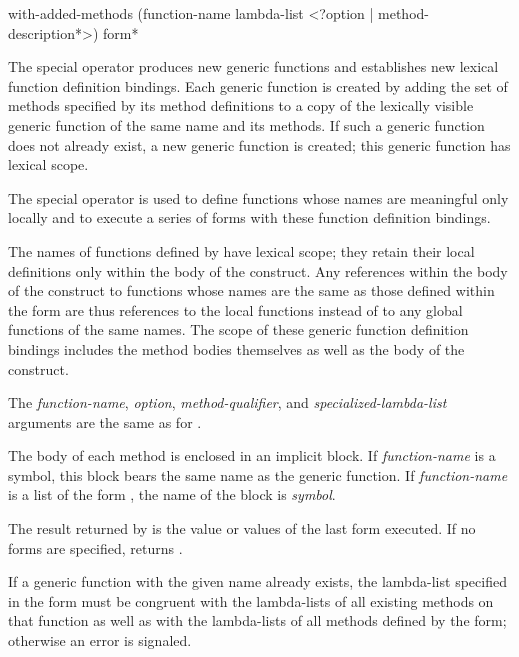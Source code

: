 \begin{defspec}
with-added-methods (function-name lambda-list
      <?option | {method-description}*>)
      {form}*

\relax
{}
\noindent
The  special operator
produces new generic functions and establishes new
lexical function definition bindings.  Each generic function is created by
adding the set of methods specified by its method definitions to a copy of the
lexically visible generic function of the same name and its methods.  If
such a generic function does not already exist, a new generic function is
created; this generic function has lexical scope.

The special operator  is used to define functions
whose names are meaningful only locally and to execute a series of
forms with these function definition bindings.


The names of functions defined by  have lexical
scope; they retain their local definitions only within the body of the
 construct.  Any references within the body of the
 construct to functions whose names are the same
as those defined within the  form are thus
references to the local functions instead of to any global functions
of the same names.  The scope of these generic function definition bindings
includes the method bodies themselves as well as the body of the 
 construct.





The \emph{function-name}, \emph{option}, \emph{method-qualifier}, and
\emph{specialized-lambda-list\/} arguments are the same as for
. 

The body of each method is enclosed in an implicit block.  If
\emph{function-name\/} is a symbol, this block bears the same name as the
generic function.  If \emph{function-name\/} is a list of the form 
, the name of the block is \emph{symbol}.  


The result returned by  is the value or values
of the last form executed.  If no forms are specified, 
 returns .


If a generic function with the given name already exists, the
lambda-list specified in the  form must be
congruent with the lambda-lists of all existing methods on that
function as well as with the lambda-lists of all methods defined by the
 form; otherwise an error is signaled.


\end{defspec}
